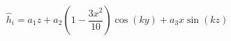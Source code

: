 $$
\hat h_i = a_1 z + a_2 \left(1 - \frac{3 x^{2}}{10}\right) \cos{\left(k y \right)} + a_3 x \sin{\left(k z \right)}
$$
